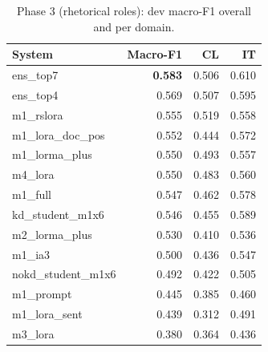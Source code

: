 \begin{table}[t]
\centering\small
\begin{tabular}{lrrr}
\toprule
System & Macro-F1 & CL & IT \\
\midrule
ens\_top7 & \textbf{0.583} & 0.506 & 0.610 \\
ens\_top4 & 0.569 & 0.507 & 0.595 \\
m1\_rslora & 0.555 & 0.519 & 0.558 \\
m1\_lora\_doc\_pos & 0.552 & 0.444 & 0.572 \\
m1\_lorma\_plus & 0.550 & 0.493 & 0.557 \\
m4\_lora & 0.550 & 0.483 & 0.560 \\
m1\_full & 0.547 & 0.462 & 0.578 \\
kd\_student\_m1x6 & 0.546 & 0.455 & 0.589 \\
m2\_lorma\_plus & 0.530 & 0.410 & 0.536 \\
m1\_ia3 & 0.500 & 0.436 & 0.547 \\
nokd\_student\_m1x6 & 0.492 & 0.422 & 0.505 \\
m1\_prompt & 0.445 & 0.385 & 0.460 \\
m1\_lora\_sent & 0.439 & 0.312 & 0.491 \\
m3\_lora & 0.380 & 0.364 & 0.436 \\
\bottomrule
\end{tabular}
\caption{Phase 3 (rhetorical roles): dev macro-F1 overall and per domain.}
\label{tab:p3}
\end{table}
